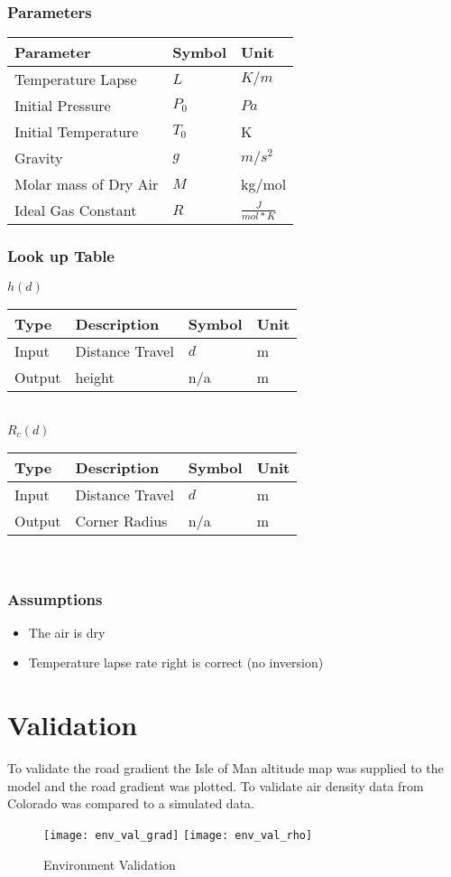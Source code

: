 \documentclass[../SimBALink.tex]{subfiles}
\begin{document}
\subsubsection{Parameters}
	\begin{tabular}{ l | l | l  }
		Parameter					&	Symbol		&	Unit		\\	\hline
		Temperature Lapse		&	$L$			&	 $K/m$ \\
		Initial Pressure 		&  $P_0$		&	$Pa$ \\
		Initial Temperature		&  $T_0$		&	K \\
		Gravity 				&  $g$			&  $m/s^2$ \\
		Molar mass of Dry Air	& $M$			&  kg/mol \\
		Ideal Gas Constant 		& $R$			& $\frac{J}{mol * K}$
	\end{tabular}
	
	\subsubsection{Look up Table}
	$h(d)$ \\
	\begin{tabular}{ l | l | l | l }
		Type				& Description		&	Symbol		&	Unit		\\	\hline
		Input 				& Distance Travel	&	$d$  		& m		\\
		Output 				& height 			&	n/a			&  m
	\end{tabular} \\
		$R_c(d)$ \\
	\begin{tabular}{ l | l | l | l }
		Type				& Description		&	Symbol		&	Unit		\\	\hline
		Input 				& Distance Travel	&	$d$  		& m		\\
		Output 				& Corner Radius 	&	n/a			&  m
	\end{tabular} \\
\subsubsection{Assumptions}
\begin{itemize}
  \item The air is dry 
  \item Temperature lapse rate right is correct (no inversion)
\end{itemize}

\section{Validation}

To validate the road gradient the Isle of Man altitude map was supplied to the model and the road gradient was plotted. To validate air density data from Colorado was compared to a simulated data.

\begin{figure}[bp!]
\center
 \texttt{[image: env\_val\_grad]}
 \texttt{[image: env\_val\_rho]}
  \caption{Environment Validation}
\end{figure}
\end{document}
